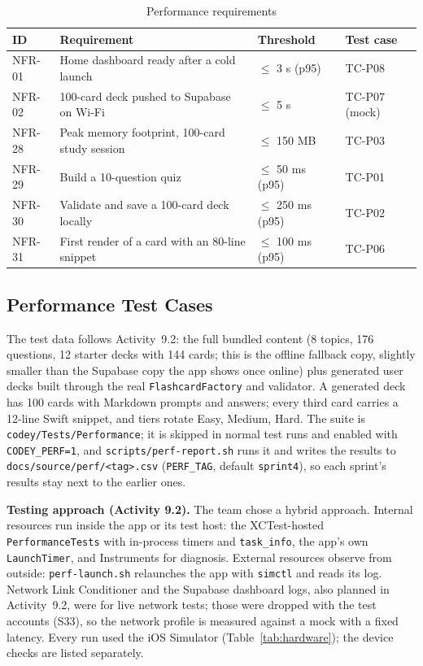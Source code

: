 \documentclass[12pt,letterpaper]{article}
\begin{document}
\begin{table}[H]
\centering
\caption{Performance requirements}
\label{tab:perfreq}
\begin{tabularx}{\textwidth}{@{}l Y L{2.0cm} L{3.0cm}@{}}
\toprule
\textbf{ID} & \textbf{Requirement} & \textbf{Threshold} & \textbf{Test case} \\
\midrule
NFR-01 & Home dashboard ready after a cold launch & $\le$ 3 s (p95) & TC-P08 \\
NFR-02 & 100-card deck pushed to Supabase on Wi-Fi & $\le$ 5 s & TC-P07 (mock) \\
NFR-28 & Peak memory footprint, 100-card study session & $\le$ 150 MB & TC-P03 \\
NFR-29 & Build a 10-question quiz & $\le$ 50 ms (p95) & TC-P01 \\
NFR-30 & Validate and save a 100-card deck locally & $\le$ 250 ms (p95) & TC-P02 \\
NFR-31 & First render of a card with an 80-line snippet & $\le$ 100 ms (p95) & TC-P06 \\
\bottomrule
\end{tabularx}
\end{table}

\subsection{Performance Test Cases}
The test data follows Activity~9.2: the full bundled content (8 topics, 176 questions,
12 starter decks with 144 cards; this is the offline fallback copy, slightly smaller
than the Supabase copy the app shows once online) plus generated user decks built through the real
\texttt{FlashcardFactory} and validator. A generated deck has 100 cards with Markdown
prompts and answers; every third card carries a 12-line Swift snippet, and tiers
rotate Easy, Medium, Hard. The suite is \texttt{codey/Tests/Performance}; it is
skipped in normal test runs and enabled with \texttt{CODEY\_PERF=1}, and
\texttt{scripts/perf-report.sh} runs it and writes the results to
\texttt{docs/source/perf/<tag>.csv} (\texttt{PERF\_TAG}, default \texttt{sprint4}), so
each sprint's results stay next to the earlier ones.

\textbf{Testing approach (Activity 9.2).} The team chose a hybrid approach. Internal
resources run inside the app or its test host: the XCTest-hosted
\texttt{PerformanceTests} with in-process timers and \texttt{task\_info}, the app's
own \texttt{LaunchTimer}, and Instruments for diagnosis. External resources observe
from outside: \texttt{perf-launch.sh} relaunches the app with \texttt{simctl} and
reads its log. Network Link Conditioner and the Supabase dashboard logs, also planned
in Activity~9.2, were for live network tests; those were dropped with the test
accounts (S33), so the network profile is measured against a mock with a fixed
latency. Every run used the iOS Simulator (Table~\ref{tab:hardware}); the device
checks are listed separately.
\end{document}

